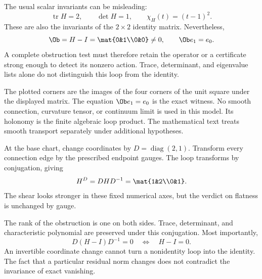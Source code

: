 
The usual scalar invariants can be misleading:
\[
\operatorname{tr}H=2,\qquad \det H=1,\qquad
\chi_H(t)=(t-1)^2.
\]
These are also the invariants of the $2\times2$ identity matrix. Nevertheless,
\[
\Ob=H-I=\mat{0&1\\0&0}\ne0,
\qquad \Ob e_1=e_0.
\]
A complete obstruction test must therefore retain the operator or a certificate strong enough to detect its nonzero action. Trace, determinant, and eigenvalue lists alone do not distinguish this loop from the identity.

The plotted corners are the images of the four corners of the unit square under the displayed matrix. The equation $\Ob e_1=e_0$ is the exact witness. No smooth connection, curvature tensor, or continuum limit is used in this model. Its holonomy is the finite algebraic loop product. The mathematical text treats smooth transport separately under additional hypotheses.


At the base chart, change coordinates by $D=\operatorname{diag}(2,1)$. Transform every connection edge by the prescribed endpoint gauges. The loop transforms by conjugation, giving
\[
H^D=DHD^{-1}=\mat{1&2\\0&1}.
\]
The shear looks stronger in these fixed numerical axes, but the verdict on flatness is unchanged by gauge.


The rank of the obstruction is one on both sides. Trace, determinant, and characteristic polynomial are preserved under this conjugation. Most importantly,
\[
D(H-I)D^{-1}=0\quad\Longleftrightarrow\quad H-I=0.
\]
An invertible coordinate change cannot turn a nonidentity loop into the identity. The fact that a particular residual norm changes does not contradict the invariance of exact vanishing.

